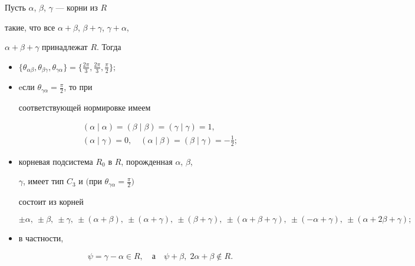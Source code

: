 \begin{lem}


Пусть $\alpha$, $\beta$, $\gamma$ --- корни из $R$


такие, что все $\alpha+\beta$, $\beta+\gamma$, $\gamma+\alpha$,


$\alpha+\beta+\gamma$ принадлежат $R$. Тогда


\begin{itemize}


\item[1)] $\{\theta_{\alpha\beta},\theta_{\beta\gamma},


\theta_{\gamma\alpha}\}=\{\frac{2\pi}3,\frac{2\pi}3,\frac{\pi}2\};$


\item[2)] eсли $\theta_{\gamma\alpha}=\frac{\pi}2$, то при


соответствующей нормировке имеем


\begin{gather}


(\alpha\mid\alpha)=(\beta\mid\beta)=(\gamma\mid\gamma)=1, \\


(\alpha\mid\gamma)=0, \quad (\alpha\mid\beta)=(\beta\mid\gamma)=-\frac12;


\end{gather}


\item[3)] корневая подсистема $R_0$ в $R$, порожденная $\alpha$, $\beta$,


$\gamma$, имеет тип $C_3$ и $($при $\theta_{\gamma\alpha}=\frac{\pi}2)$


состоит из корней


\begin{equation}


\pm\alpha,\ \pm\beta,\ \pm\gamma,\ \pm(\alpha{+}


\beta),\ \pm(\alpha{+}\gamma),


\ \pm(\beta{+}\gamma),\ \pm(\alpha{+}\beta{+}\gamma),\ \pm(-\alpha{+}\gamma),


\ \pm(\alpha{+}2\beta{+}\gamma);


\end{equation}


\item[4)] в частности, 


\begin{equation}


\psi=\gamma-\alpha\in R, \quad \text{а} \quad \psi+\beta,\;


2\alpha+\beta\notin R.


\end{equation}


\end{itemize}


\end{lem}








